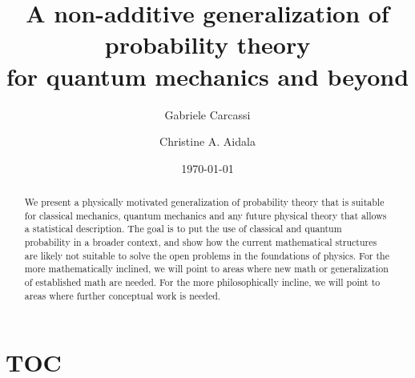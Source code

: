 \documentclass[10pt,twocolumn, nofootinbib]{revtex4-2}
\begin{document}
\title{A non-additive generalization of probability theory \\for quantum mechanics and beyond}
\author{Gabriele Carcassi}
\author{Christine A. Aidala}

\date{\today}


\begin{abstract}
	We present a physically motivated generalization of probability theory that is suitable for classical mechanics, quantum mechanics and any future physical theory that allows a statistical description. The goal is to put the use of classical and quantum probability in a broader context, and show how the current mathematical structures are likely not suitable to solve the open problems in the foundations of physics. For the more mathematically inclined, we will point to areas where new math or generalization of established math are needed. For the more philosophically incline, we will point to areas where further conceptual work is needed.
	
	
\end{abstract}

\maketitle

\section{TOC}
\end{document}

